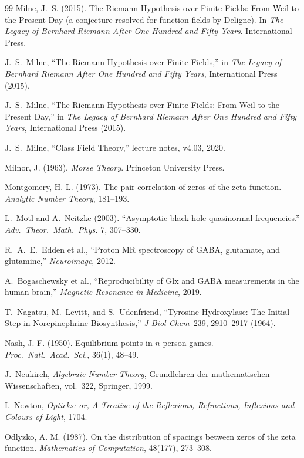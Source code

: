 \begin{thebibliography}{99}
Milne, J.~S. (2015).
The Riemann Hypothesis over Finite Fields: From Weil to the Present Day (a conjecture resolved for function fields by Deligne).
In \emph{The Legacy of Bernhard Riemann After One Hundred and Fifty Years}. International Press.

 J.~S.~Milne, ``The Riemann Hypothesis over Finite Fields,'' in \emph{The Legacy of Bernhard Riemann After One Hundred and Fifty Years}, International Press (2015).

J.~S.~Milne,
``The Riemann Hypothesis over Finite Fields: From Weil to the Present Day,''
in \emph{The Legacy of Bernhard Riemann After One Hundred and Fifty Years},
International Press (2015).

J.~S.~Milne,
``Class Field Theory,''
lecture notes, v4.03, 2020.

 Milnor, J. (1963). \emph{Morse Theory}. Princeton University Press.

 Montgomery, H. L. (1973). The pair correlation of zeros of the zeta function. \emph{Analytic Number Theory}, 181--193.

L.~Motl and A.~Neitzke (2003).
``Asymptotic black hole quasinormal frequencies.''
\textit{Adv.\ Theor.\ Math.\ Phys.} 7, 307--330.

 R.~A.~E.~Edden et al., ``Proton MR spectroscopy of GABA, glutamate, and glutamine,'' \emph{Neuroimage}, 2012.

 A.~Bogaschewsky et al., ``Reproducibility of Glx and GABA measurements in the human brain,'' \emph{Magnetic Resonance in Medicine}, 2019.

 T.~Nagatsu, M.~Levitt, and S.~Udenfriend, ``Tyrosine Hydroxylase: The Initial Step in Norepinephrine Biosynthesis,'' \emph{J Biol Chem}\ 239, 2910--2917 (1964).

 Nash, J. F. (1950). Equilibrium points in $n$-person games. \emph{Proc.\ Natl.\ Acad.\ Sci.}, 36(1), 48--49.

J.~Neukirch,
\emph{Algebraic Number Theory},
Grundlehren der mathematischen Wissenschaften, vol.~322, Springer, 1999.

I.~Newton, \emph{Opticks: or, A Treatise of the Reflexions, Refractions, Inflexions and Colours of Light}, 1704.

 Odlyzko, A. M. (1987). On the distribution of spacings between zeros of the zeta function. \emph{Mathematics of Computation}, 48(177), 273--308.


\end{thebibliography}

